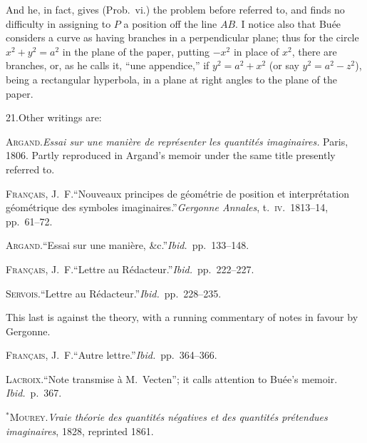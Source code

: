 \documentclass[11pt]{article}
\begin{document}
And he, in fact, gives (Prob.~vi.) the problem before referred to, and finds no difficulty in assigning to $P$ a position off the line $AB$. I notice also that Bu\'ee considers a curve as having branches in a perpendicular plane; thus for the circle $x^{2} + y^{2} = a^{2}$ in the plane of the paper, putting $-x^{2}$ in place of $x^{2}$, there are branches, or, as he calls it, ``une appendice,'' if $y^{2} = a^{2} + x^{2}$ (or say $y^{2} = a^{2} - z^{2}$), being a rectangular hyperbola, in a plane at right angles to the plane of the paper.

21.\quad Other writings are:

\smallskip

\textsc{Argand.}\quad \textit{Essai sur une mani\`ere de repr\'esenter les quantit\'es imaginaires.} Paris, 1806. Partly reproduced in Argand's memoir under the same title presently referred to.

\smallskip

\textsc{Fran\c{c}ais, J.~F.}\quad ``Nouveaux principes de g\'eom\'etrie de position et interpr\'etation g\'eom\'etrique des symboles imaginaires.''\quad \textit{Gergonne Annales}, t.~\textsc{iv}.\ 1813--14, pp.~61--72.

\smallskip

\textsc{Argand.}\quad ``Essai sur une mani\`ere, \&c.''\quad \textit{Ibid.}\ pp.~133--148.

\smallskip

\textsc{Fran\c{c}ais, J.~F.}\quad ``Lettre au R\'edacteur.''\quad \textit{Ibid.}\ pp.~222--227.

\smallskip

\textsc{Servois.}\quad ``Lettre au R\'edacteur.''\quad \textit{Ibid.}\ pp.~228--235.

\smallskip

This last is against the theory, with a running commentary of notes in favour by Gergonne.

\smallskip

\textsc{Fran\c{c}ais, J.~F.}\quad ``Autre lettre.''\quad \textit{Ibid.}\ pp.~364--366.

\smallskip

\textsc{Lacroix.}\quad ``Note transmise \`a M.~Vecten''; it calls attention to Bu\'ee's memoir. \textit{Ibid.}\ p.~367.

\smallskip

$^{*}$\textsc{Mourey.}\quad \textit{Vraie th\'eorie des quantit\'es n\'egatives et des quantit\'es pr\'etendues imaginaires}, 1828, reprinted 1861.
\end{document}
